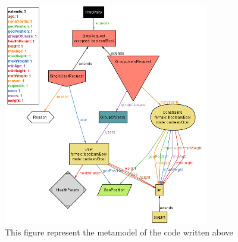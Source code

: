 \begin{figure}[h!]
	\includegraphics[width=0.80\textwidth]{./pictures/world3.png}\par
	\caption{This figure represent the metamodel of the code written above}
\end{figure}

